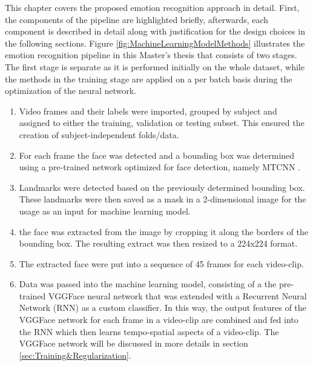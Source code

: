 This chapter covers the proposed emotion recognition approach in detail. First, the components of the pipeline are highlighted briefly, afterwards, each component is described in detail along with justification for the design choices in the following sections. 
\newline\newline
Figure \ref{fig:MachineLearningModelMethods} illustrates the emotion recognition pipeline in this Master's thesis that consists of two stages. The first stage is separate as it is performed initially on the whole dataset, while the methods in the training stage are applied on a per batch basis during the optimization of the neural network.

\begin{enumerate}
    \item Video frames and their labels were imported, grouped by subject and assigned to either the training, validation or testing subset. This ensured the creation of subject-independent folds/data.
    \item For each frame the face was detected and a bounding box was determined using a pre-trained network optimized for face detection, namely MTCNN \citep{Zhang:2016:MTCCN}.
    \item Landmarks were detected based on the previously determined bounding box. These landmarks were then saved as a mask in a 2-dimensional image for the usage as an input for machine learning model.
    \item the face was extracted from the image by cropping it along the borders of the bounding box. The resulting extract was then resized to a 224x224 format.
    \item The extracted face were put into a sequence of 45 frames for each video-clip.
    \item Data was passed into the machine learning model, consisting of a the pre-trained VGGFace \citep{Cao:2018:VGGFace2} neural network that was extended with a Recurrent Neural Network (RNN) as a custom classifier. In this way, the output features of the VGGFace network for each frame in a video-clip are combined and fed into the RNN which then learns  tempo-spatial aspects of a video-clip. The VGGFace network will be discussed in more details in section \ref{sec:Training&Regularization}.
\end{enumerate}


